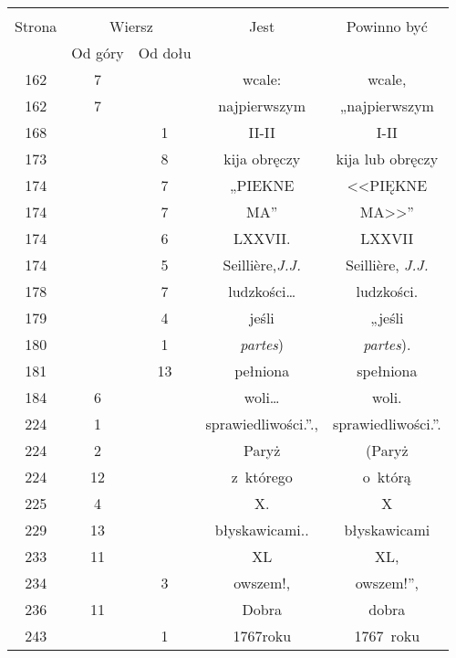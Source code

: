\documentclass[a4paper,11pt]{article}
\begin{document}
\begin{center}
  \begin{tabular}{|c|c|c|c|c|}
    \hline
    & \multicolumn{2}{c|}{} & & \\
    Strona & \multicolumn{2}{c|}{Wiersz} & Jest
                              & Powinno być \\ \cline{2-3}
    & Od góry & Od dołu & & \\
    \hline
    162 &  7 & & wcale: & wcale, \\
    162 &  7 & & najpierwszym & „najpierwszym \\
    168 & &  1 & II-II & I-II \\
    173 & &  8 & kija obręczy & kija lub obręczy \\
    174 & &  7 & „PIEKNE & <<PIĘKNE  %
    \\
    174 & &  7 & {\footnotesize MA}” & {\footnotesize MA}>>” \\
    174 & &  6 & LXXVII. & LXXVII \\
    174 & &  5 & Seilli\`{e}re,\textit{J.J.}
           & Seilli\`{e}re, \textit{J.J.} \\
    178 & &  7 & ludzkości\ldots & ludzkości. \\
    179 & &  4 & jeśli & „jeśli \\
    180 & &  1 & \textit{partes}) & \textit{partes}). \\
    181 & & 13 & pełniona & spełniona \\
    184 &  6 & & woli\ldots & woli. \\
    224 &  1 & & sprawiedliwości.”., & sprawiedliwości.”. \\
    224 &  2 & & Paryż & (Paryż \\
    224 & 12 & & z~którego & o~którą \\
    225 &  4 & & X. & X \\
    229 & 13 & & błyskawicami.. & błyskawicami \\
    233 & 11 & & XL & XL, \\
    234 & &  3 & owszem!, & owszem!”, \\
    236 & 11 & & Dobra & dobra \\
    243 & &  1 & 1767roku & 1767~roku \\
    \hline
  \end{tabular}

\end{center}

\vspace{\spaceTwo}
\end{document}
